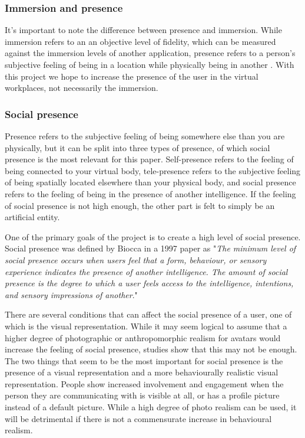   
\subsubsection{Immersion and presence} \label{immersionAndPresence}
It's important to note the difference between presence and immersion. While immersion refers to an an objective level of fidelity, which can be measured against the immersion levels of another application, presence refers to a person's subjective feeling of being in a location while physically being in another \cite{slater2003note}. With this project we hope to increase the presence of the user in the virtual workplaces, not necessarily the immersion.

\subsubsection{Social presence}
Presence refers to the subjective feeling of being somewhere else than you are physically, but it can be split into three types of presence, of which social presence is the most relevant for this paper. Self-presence refers to the feeling of being connected to your virtual body, tele-presence refers to the subjective feeling of being spatially located elsewhere than your physical body, and social presence refers to the feeling of being in the presence of another intelligence. If the feeling of social presence is not high enough, the other part is felt to simply be an artificial entity.

One of the primary goals of the project is to create a high level of social presence. Social presence was defined by Biocca in a 1997 paper as "\textit{The minimum level of social presence occurs when users feel that a form, behaviour, or sensory experience indicates the presence of another intelligence. The amount of social presence is the degree to which a user feels access to the intelligence, intentions, and sensory impressions of another}\cite{biocca1997cyborg}."

There are several conditions that can affect the social presence of a user, one of which is the visual representation. While it may seem logical to assume that a higher degree of photographic or anthropomorphic realism for avatars would increase the feeling of social presence, studies show that this may not be enough. The two things that seem to be the most important for social presence is the presence of a visual representation and a more behaviourally realistic visual representation. People show increased involvement and engagement when the person they are communicating with is visible at all, or has a profile picture instead of a default picture. While a high degree of photo realism can be used, it will be detrimental if there is not a commensurate increase in behavioural realism\cite{oh2018systematic}.


